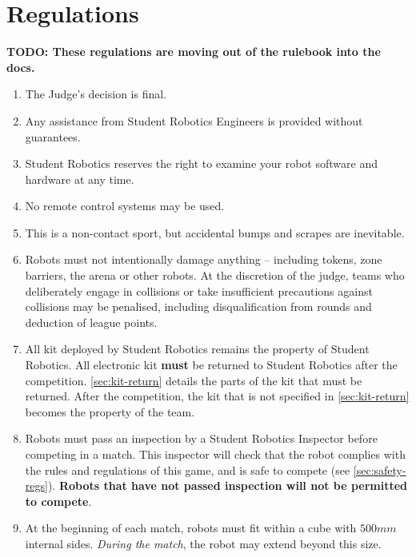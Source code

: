 \section {Regulations}
\label{sec:Regulations}

\textbf{TODO: These regulations are moving out of the rulebook into the docs.}

\begin{enumerate}


\item The Judge's decision is final.
\item Any assistance from Student Robotics Engineers is provided without guarantees.
\item Student Robotics reserves the right to examine your robot software and hardware at any time.


\item No remote control systems may be used.
\item This is a non-contact sport, but accidental bumps and scrapes are inevitable.
\item Robots must not intentionally damage anything -- including tokens, zone barriers, the arena or other robots.
      At the discretion of the judge, teams who deliberately engage in collisions or take insufficient precautions against collisions may be penalised, including disqualification from rounds and deduction of league points.
\item All kit deployed by Student Robotics remains the property of Student Robotics.
      All electronic kit \textbf{must} be returned to Student Robotics after the competition.
      \autoref{sec:kit-return} details the parts of the kit that must be returned.
      After the competition, the kit that is not specified in \autoref{sec:kit-return} becomes the property of the team.


\item Robots must pass an inspection by a Student Robotics Inspector before competing in a match.
      This inspector will check that the robot complies with the rules and regulations of this game, and is safe to compete (see \autoref{sec:safety-regs}).
      \textbf{Robots that have not passed inspection will not be permitted to compete}.

\item At the beginning of each match, robots must fit within a cube with $500mm$ internal sides.
      \textit{During the match}, the robot may extend beyond this size.


\end{enumerate}
